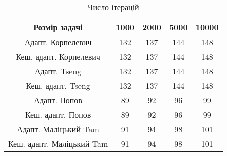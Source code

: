 \begin{table}[H]
	\centering
	\begin{tabular}{|c||c|c|c|c|}\hline
		Розмір задачі & 1000 & 2000 & 5000 & 10000 \\ \hline \hline
		Адапт. Корпелевич & 132 & 137 & 144 & 148 \\ \hline
		Кеш. адапт. Корпелевич & 132 & 137 & 144 & 148 \\ \hline
		Адапт. Tseng & 132 & 137 & 144 & 148 \\ \hline
		Кеш. адапт. Tseng & 132 & 137 & 144 & 148 \\ \hline
		Адапт. Попов & 89 & 92 & 96 & 99 \\ \hline
		Кеш. адапт. Попов & 89 & 92 & 96 & 99 \\ \hline
		Адапт. Маліцький Tam & 91 & 94 & 98 & 101 \\ \hline
		Кеш. адапт. Маліцький Tam & 91 & 94 & 98 & 101 \\ \hline
	\end{tabular}
	\caption{Число ітерацій}
\end{table}
